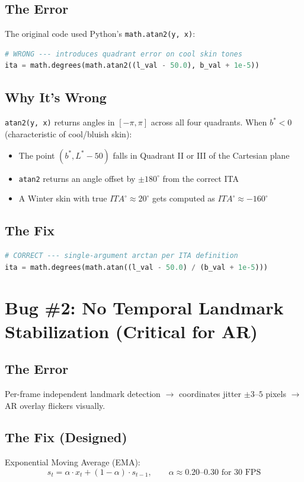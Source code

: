 \documentclass[12pt,a4paper]{article}
\begin{document}
\subsection{The Error}
The original code used Python's \texttt{math.atan2(y, x)}:
\begin{lstlisting}[language=Python]
# WRONG --- introduces quadrant error on cool skin tones
ita = math.degrees(math.atan2((l_val - 50.0), b_val + 1e-5))
\end{lstlisting}

\subsection{Why It's Wrong}
\texttt{atan2(y, x)} returns angles in $[-\pi, \pi]$ across all four quadrants. When $b^* < 0$ (characteristic of cool/bluish skin):
\begin{itemize}
    \item The point $(b^*, L^*{-}50)$ falls in Quadrant II or III of the Cartesian plane
    \item \texttt{atan2} returns an angle offset by $\pm 180^{\circ}$ from the correct ITA\textdegree{}
    \item A Winter skin with true $ITA^{\circ} \approx 20^{\circ}$ gets computed as $ITA^{\circ} \approx -160^{\circ}$
\end{itemize}

\subsection{The Fix}
\begin{lstlisting}[language=Python]
# CORRECT --- single-argument arctan per ITA definition
ita = math.degrees(math.atan((l_val - 50.0) / (b_val + 1e-5)))
\end{lstlisting}


\section{Bug \#2: No Temporal Landmark Stabilization (Critical for AR)}

\subsection{The Error}
Per-frame independent landmark detection $\to$ coordinates jitter $\pm 3$--$5$ pixels $\to$ AR overlay flickers visually.

\subsection{The Fix (Designed)}
Exponential Moving Average (EMA):
\begin{equation}
s_t = \alpha \cdot x_t + (1 - \alpha) \cdot s_{t-1}, \qquad \alpha \approx 0.20\text{--}0.30 \text{ for 30 FPS}
\end{equation}
\end{document}
